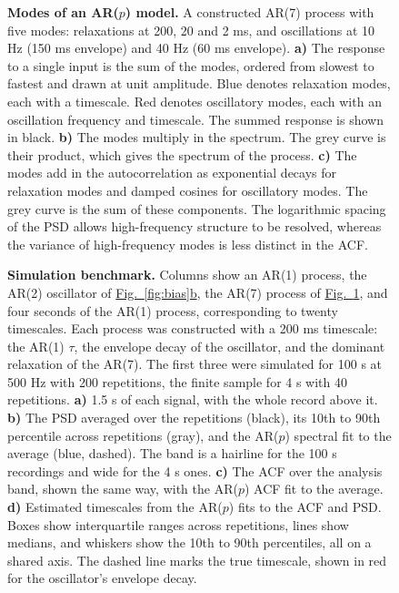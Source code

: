 \documentclass[pdflatex,sn-mathphys-num]{sn-jnl}
\newcommand{\figpanel}[2]{\hyperref[#1]{Fig.~\ref*{#1}#2}}
\begin{document}
\begin{figure}[htbp]
\centering

\caption{\textbf{Modes of an AR($p$) model.} A constructed AR(7) process with five modes: relaxations at 200, 20 and 2 ms, and oscillations at 10 Hz (150 ms envelope) and 40 Hz (60 ms envelope). \textbf{a)} The response to a single input is the sum of the modes, ordered from slowest to fastest and drawn at unit amplitude. Blue denotes relaxation modes, each with a timescale. Red denotes oscillatory modes, each with an oscillation frequency and timescale. The summed response is shown in black. \textbf{b)} The modes multiply in the spectrum. The grey curve is their product, which gives the spectrum of the process. \textbf{c)} The modes add in the autocorrelation as exponential decays for relaxation modes and damped cosines for oscillatory modes. The grey curve is the sum of these components. The logarithmic spacing of the PSD allows high-frequency structure to be resolved, whereas the variance of high-frequency modes is less distinct in the ACF.}
\label{fig:modes}
\end{figure}

\begin{figure}[htbp]
\centering

\caption{\textbf{Simulation benchmark.} Columns show an AR(1) process, the AR(2) oscillator of \figpanel{fig:bias}{b}, the AR(7) process of \figpanel{fig:modes}{}, and four seconds of the AR(1) process, corresponding to twenty timescales. Each process was constructed with a 200 ms timescale: the AR(1) $\tau$, the envelope decay of the oscillator, and the dominant relaxation of the AR(7). The first three were simulated for 100 s at 500 Hz with 200 repetitions, the finite sample for 4 s with 40 repetitions. \textbf{a)} 1.5 s of each signal, with the whole record above it. \textbf{b)} The PSD averaged over the repetitions (black), its 10th to 90th percentile across repetitions (gray), and the AR($p$) spectral fit to the average (blue, dashed). The band is a hairline for the 100 s recordings and wide for the 4 s ones. \textbf{c)} The ACF over the analysis band, shown the same way, with the AR($p$) ACF fit to the average. \textbf{d)} Estimated timescales from the AR($p$) fits to the ACF and PSD. Boxes show interquartile ranges across repetitions, lines show medians, and whiskers show the 10th to 90th percentiles, all on a shared axis. The dashed line marks the true timescale, shown in red for the oscillator's envelope decay.}
\label{fig:benchmark}
\end{figure}
\end{document}
